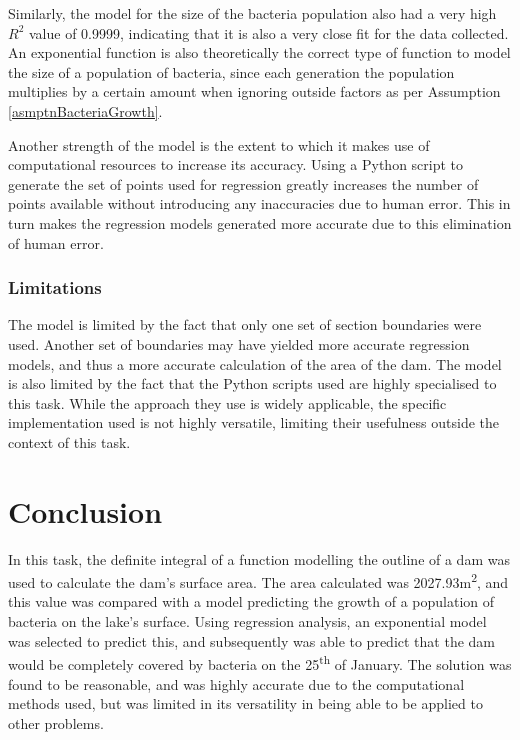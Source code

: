 \documentclass[a4paper]{article}
\theoremstyle{definition}
\begin{document}
            Similarly, the model for the size of the bacteria population also had a very high $R^2$ value of 0.9999, indicating that it is also a very close fit for the data collected. An exponential function is also theoretically the correct type of function to model the size of a population of bacteria, since each generation the population multiplies by a certain amount when ignoring outside factors as per Assumption \ref{asmptnBacteriaGrowth}.

            Another strength of the model is the extent to which it makes use of computational resources to increase its accuracy. Using a Python script to generate the set of points used for regression greatly increases the number of points available without introducing any inaccuracies due to human error. This in turn makes the regression models generated more accurate due to this elimination of human error. 


        \subsubsection{Limitations}
            The model is limited by the fact that only one set of section boundaries were used. Another set of boundaries may have yielded more accurate regression models, and thus a more accurate calculation of the area of the dam. 
            The model is also limited by the fact that the Python scripts used are highly specialised to this task. While the approach they use is widely applicable, the specific implementation used is not highly versatile, limiting their usefulness outside the context of this task.

\section{Conclusion}
In this task, the definite integral of a function modelling the outline of a dam was used to calculate the dam's surface area. The area calculated was 2027.93m\textsuperscript{2}, and this value was compared with a model predicting the growth of a population of bacteria on the lake's surface. Using regression analysis, an exponential model was selected to predict this, and subsequently was able to predict that the dam would be completely covered by bacteria on the 25\textsuperscript{th} of January. The solution was found to be reasonable, and was highly accurate due to the computational methods used, but was limited in its versatility in being able to be applied to other problems.
\end{document}
